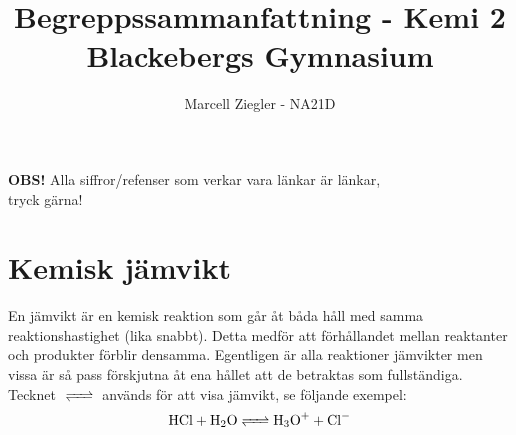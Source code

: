 \documentclass[12pt]{article}
\title{Begreppssammanfattning - Kemi 2 \\ Blackebergs Gymnasium}
\author{Marcell Ziegler - NA21D}
\theoremstyle{definition}
\begin{document}
    \begin{titlepage}
        \maketitle
        \vfill
        
        \begin{center}
            \textbf{OBS!} Alla siffror/refenser som verkar vara länkar är länkar, \\ tryck gärna!
        \end{center}
    \end{titlepage}

    \tableofcontents

    \newpage

    \part{Kemisk jämvikt}
    
    En jämvikt är en kemisk reaktion som går åt båda håll med samma reaktionshastighet (lika snabbt). Detta medför att förhållandet mellan reaktanter och produkter förblir densamma. Egentligen är alla reaktioner jämvikter men vissa är så pass förskjutna åt ena hållet att de betraktas som fullständiga. Tecknet $\ce{<=>}$ används för att visa jämvikt, se följande exempel:
    \begin{equation*}
        \ce{HCl + H2O <=> H3O+ + Cl-}
    \end{equation*}

    
    \setcounter{exm}{0}
    
    \setcounter{exm}{0}
    
\end{document}

